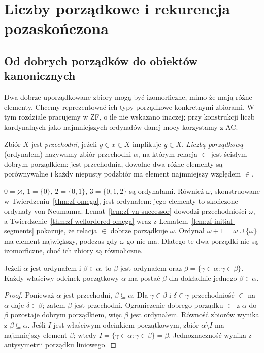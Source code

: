 \chapter{Liczby porządkowe i rekurencja pozaskończona}\label{ch:ordinals}

\section{Od dobrych porządków do obiektów kanonicznych}
Dwa dobrze uporządkowane zbiory mogą być izomorficzne, mimo że mają różne elementy. Chcemy reprezentować ich typy porządkowe konkretnymi zbiorami. W tym rozdziale pracujemy w ZF, o ile nie wskazano inaczej; przy konstrukcji liczb kardynalnych jako najmniejszych ordynałów danej mocy korzystamy z AC.
\begin{definicja}\label{def:ordinal}
Zbiór $X$ jest \emph{przechodni}, jeżeli $y\in x\in X$ implikuje $y\in X$. \emph{Liczbą porządkową} (ordynałem) nazywamy zbiór przechodni $\alpha$, na którym relacja $\in$ jest ścisłym dobrym porządkiem: jest przechodnia, dowolne dwa różne elementy są porównywalne i każdy niepusty podzbiór ma element najmniejszy względem $\in$.
\end{definicja}
\begin{przyklad}
$0=\varnothing$, $1=\{0\}$, $2=\{0,1\}$, $3=\{0,1,2\}$ są ordynałami. Również $\omega$, skonstruowane w Twierdzeniu~\ref{thm:zf-omega},
jest ordynałem: jego elementy to skończone ordynały von Neumanna.
Lemat~\ref{lem:zf-vn-successor} dowodzi przechodniości $\omega$,
a Twierdzenie~\ref{thm:zf-wellordered-omega} wraz
z Lematem~\ref{lem:zf-initial-segments} pokazuje,
że relacja $\in$ dobrze porządkuje $\omega$. Ordynał $\omega+1=\omega\cup\{\omega\}$ ma element największy, podczas gdy $\omega$ go nie ma. Dlatego te dwa porządki nie są izomorficzne, choć ich zbiory są równoliczne.
\end{przyklad}
\begin{lemat}\label{lem:ordinal-segments}
Jeżeli $\alpha$ jest ordynałem i $\beta\in\alpha$, to $\beta$ jest ordynałem oraz $\beta=\{\gamma\in\alpha:\gamma\in\beta\}$. Każdy właściwy odcinek początkowy $\alpha$ ma postać $\beta$ dla dokładnie jednego $\beta\in\alpha$.
\end{lemat}
\begin{proof}
Ponieważ $\alpha$ jest przechodni, $\beta\subseteq\alpha$. Dla $\gamma\in\beta$ i $\delta\in\gamma$ przechodniość $\in$ na $\alpha$ daje $\delta\in\beta$; zatem $\beta$ jest przechodni. Ograniczenie dobrego porządku $\in$ z $\alpha$ do $\beta$ pozostaje dobrym porządkiem, więc $\beta$ jest ordynałem. Równość zbiorów wynika z $\beta\subseteq\alpha$. Jeśli $I$ jest właściwym odcinkiem początkowym, zbiór $\alpha\setminus I$ ma najmniejszy element $\beta$; wtedy $I=\{\gamma\in\alpha:\gamma\in\beta\}=\beta$. Jednoznaczność wynika z antysymetrii porządku liniowego.
\end{proof}
